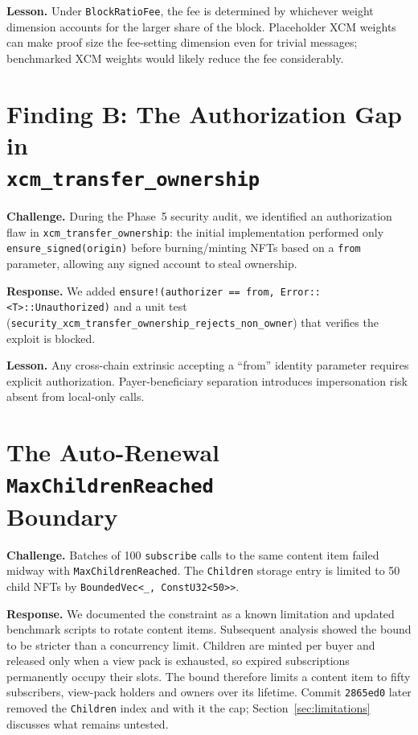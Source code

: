 \textbf{Lesson.} Under \texttt{BlockRatioFee}, the fee is determined by whichever weight dimension accounts for the larger share of the block. Placeholder XCM weights can make proof size the fee-setting dimension even for trivial messages; benchmarked XCM weights would likely reduce the fee considerably.

\section[Finding B: Authorization Gap]{Finding B: The Authorization Gap in\texorpdfstring{\\}{ }\texttt{xcm\_transfer\_ownership}}\label{sec:xcm-auth-gap}

\textbf{Challenge.} During the Phase~5 security audit, we identified an authorization flaw in \texttt{xcm\_transfer\_ownership}: the initial implementation performed only \texttt{ensure\_signed(origin)} before burning/minting NFTs based on a \texttt{from} parameter, allowing any signed account to steal ownership.

\textbf{Response.} We added \texttt{ensure!(authorizer == from, Error::<T>::Unauthorized)} and a unit test (\texttt{security\_xcm\_transfer\_ownership\_rejects\_non\_owner}) that verifies the exploit is blocked.

\textbf{Lesson.} Any cross-chain extrinsic accepting a ``from'' identity parameter requires explicit authorization. Payer-beneficiary separation introduces impersonation risk absent from local-only calls.

\section[Auto-Renewal Child Cap]{The Auto-Renewal \texttt{MaxChildrenReached}\texorpdfstring{\\}{ }Boundary}\label{sec:children-bound}

\textbf{Challenge.} Batches of 100 \texttt{subscribe} calls to the same content item failed midway with \texttt{MaxChildrenReached}. The \texttt{Children} storage entry is limited to 50 child NFTs by \texttt{BoundedVec<\_, ConstU32<50>{}>}.

\textbf{Response.} We documented the constraint as a known limitation and updated benchmark scripts to rotate content items. Subsequent analysis showed the bound to be stricter than a concurrency limit. Children are minted per buyer and released only when a view pack is exhausted, so expired subscriptions permanently occupy their slots. The bound therefore limits a content item to fifty subscribers, view-pack holders and owners over its lifetime. Commit \texttt{2865ed0} later removed the \texttt{Children} index and with it the cap; Section~\ref{sec:limitations} discusses what remains untested.

